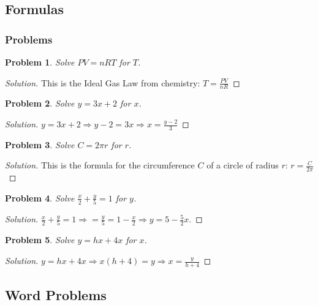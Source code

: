 \documentclass[oneside]{book}
\theoremstyle{mystyle}
\newtheorem{problem}{Problem}[section]
\begin{document}
\subsection{Formulas}
\subsubsection{Problems}
\begin{problem}
Solve $PV = nRT$ for $T$.
\end{problem}
\begin{proof}[Solution]
This is the Ideal Gas Law from chemistry: $\boxed{T = \tfrac{PV}{nR}}$
\end{proof}
\begin{problem}
Solve $y=3x+2$ for $x$.
\end{problem}
\begin{proof}[Solution]
$y = 3x+2 \Rightarrow y-2 = 3x \Rightarrow \boxed{x =  \tfrac{y-2}{3}}$
\end{proof}
\begin{problem}
Solve $C = 2\pi r$ for $r$.
\end{problem}
\begin{proof}[Solution]
This is the formula for the circumference $C$ of a circle of radius $r$: $\boxed{r = \tfrac{C}{2\pi}}$
\end{proof}
\begin{problem}
Solve $\tfrac{x}{2}+\tfrac{y}{5} = 1$ for $y$.
\end{problem}
\begin{proof}[Solution]
$\tfrac{x}{2}+\tfrac{y}{5}=1\Rightarrow=\tfrac{y}{5}=1-\tfrac{x}{2}\Rightarrow\boxed{y=5-\tfrac{5}{2}x}$.
\end{proof}
\begin{problem}
Solve $y=hx+4x$ for $x$.
\end{problem}
\begin{proof}[Solution]
$y = hx+4x \Rightarrow x(h+4) = y \Rightarrow \boxed{x= \tfrac{y}{h+4}}$
\end{proof}
\subsection{Word Problems}
\end{document}
